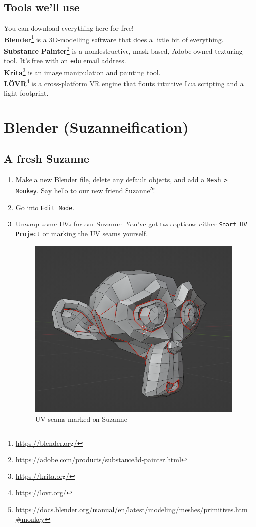 \documentclass[12pt, letterpaper]{article}
\begin{document}
\subsection{Tools we'll use}
You can download everything here for free!\\
\textbf{Blender}\footnote{\url{https://blender.org/}} is a 3D-modelling software that does a little bit of everything.\\
\textbf{Substance Painter}\footnote{\url{https://adobe.com/products/substance3d-painter.html}} is a nondestructive, mask-based, Adobe-owned texturing tool. It's free with an \verb|edu| email address.\\
\textbf{Krita}\footnote{\url{https://krita.org/}} is an image manipulation and painting tool.\\
\textbf{L{\"O}VR}\footnote{\url{https://lovr.org/}} is a cross-platform VR engine that flouts intuitive Lua scripting and a light footprint.

\section{Blender (Suzanneification)}

\subsection{A fresh Suzanne}
\begin{enumerate}
    \item Make a new Blender file, delete any default objects, and add a \verb|Mesh > Monkey|. Say hello to our new friend Suzanne\footnote{\url{https://docs.blender.org/manual/en/latest/modeling/meshes/primitives.htm\#monkey}}!
    \item Go into \verb|Edit Mode|.
    \item Unwrap some UVs for our Suzanne. You've got two options: either \verb|Smart UV Project| or marking the UV seams yourself.
          \begin{figure}[H]
              \includegraphics[scale=0.5]{assets/img/blender-seams.png}
              \caption{UV seams marked on Suzanne.}
          \end{figure}
\end{enumerate}
\end{document}
